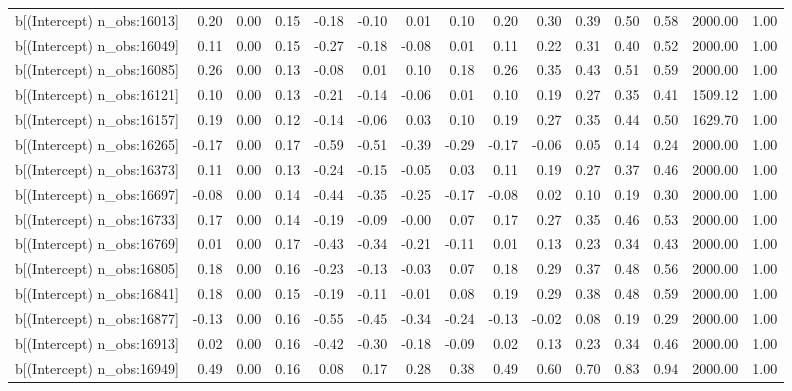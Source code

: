 \begin{table}[ht]
\begin{tabular}{rrrrrrrrrrrrrrr}
  b[(Intercept) n\_obs:16013] & 0.20 & 0.00 & 0.15 & -0.18 & -0.10 & 0.01 & 0.10 & 0.20 & 0.30 & 0.39 & 0.50 & 0.58 & 2000.00 & 1.00 \\ 
  b[(Intercept) n\_obs:16049] & 0.11 & 0.00 & 0.15 & -0.27 & -0.18 & -0.08 & 0.01 & 0.11 & 0.22 & 0.31 & 0.40 & 0.52 & 2000.00 & 1.00 \\ 
  b[(Intercept) n\_obs:16085] & 0.26 & 0.00 & 0.13 & -0.08 & 0.01 & 0.10 & 0.18 & 0.26 & 0.35 & 0.43 & 0.51 & 0.59 & 2000.00 & 1.00 \\ 
  b[(Intercept) n\_obs:16121] & 0.10 & 0.00 & 0.13 & -0.21 & -0.14 & -0.06 & 0.01 & 0.10 & 0.19 & 0.27 & 0.35 & 0.41 & 1509.12 & 1.00 \\ 
  b[(Intercept) n\_obs:16157] & 0.19 & 0.00 & 0.12 & -0.14 & -0.06 & 0.03 & 0.10 & 0.19 & 0.27 & 0.35 & 0.44 & 0.50 & 1629.70 & 1.00 \\ 
  b[(Intercept) n\_obs:16265] & -0.17 & 0.00 & 0.17 & -0.59 & -0.51 & -0.39 & -0.29 & -0.17 & -0.06 & 0.05 & 0.14 & 0.24 & 2000.00 & 1.00 \\ 
  b[(Intercept) n\_obs:16373] & 0.11 & 0.00 & 0.13 & -0.24 & -0.15 & -0.05 & 0.03 & 0.11 & 0.19 & 0.27 & 0.37 & 0.46 & 2000.00 & 1.00 \\ 
  b[(Intercept) n\_obs:16697] & -0.08 & 0.00 & 0.14 & -0.44 & -0.35 & -0.25 & -0.17 & -0.08 & 0.02 & 0.10 & 0.19 & 0.30 & 2000.00 & 1.00 \\ 
  b[(Intercept) n\_obs:16733] & 0.17 & 0.00 & 0.14 & -0.19 & -0.09 & -0.00 & 0.07 & 0.17 & 0.27 & 0.35 & 0.46 & 0.53 & 2000.00 & 1.00 \\ 
  b[(Intercept) n\_obs:16769] & 0.01 & 0.00 & 0.17 & -0.43 & -0.34 & -0.21 & -0.11 & 0.01 & 0.13 & 0.23 & 0.34 & 0.43 & 2000.00 & 1.00 \\ 
  b[(Intercept) n\_obs:16805] & 0.18 & 0.00 & 0.16 & -0.23 & -0.13 & -0.03 & 0.07 & 0.18 & 0.29 & 0.37 & 0.48 & 0.56 & 2000.00 & 1.00 \\ 
  b[(Intercept) n\_obs:16841] & 0.18 & 0.00 & 0.15 & -0.19 & -0.11 & -0.01 & 0.08 & 0.19 & 0.29 & 0.38 & 0.48 & 0.59 & 2000.00 & 1.00 \\ 
  b[(Intercept) n\_obs:16877] & -0.13 & 0.00 & 0.16 & -0.55 & -0.45 & -0.34 & -0.24 & -0.13 & -0.02 & 0.08 & 0.19 & 0.29 & 2000.00 & 1.00 \\ 
  b[(Intercept) n\_obs:16913] & 0.02 & 0.00 & 0.16 & -0.42 & -0.30 & -0.18 & -0.09 & 0.02 & 0.13 & 0.23 & 0.34 & 0.46 & 2000.00 & 1.00 \\ 
  b[(Intercept) n\_obs:16949] & 0.49 & 0.00 & 0.16 & 0.08 & 0.17 & 0.28 & 0.38 & 0.49 & 0.60 & 0.70 & 0.83 & 0.94 & 2000.00 & 1.00 \\ 

\end{tabular}
\end{table}
